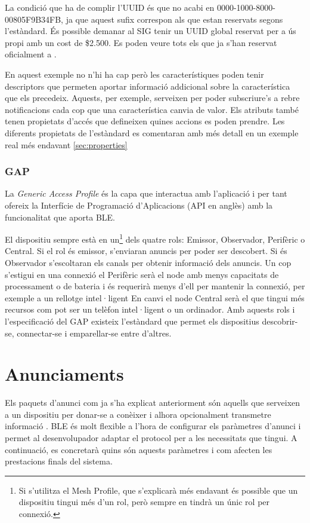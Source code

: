 La condició que ha de complir l'UUID és que no acabi en 0000-1000-8000-00805F9B34FB, ja que aquest sufix correspon als que estan reservats segons l'estàndard.
És possible demanar al SIG tenir un UUID global reservat per a ús propi amb un cost de \$2.500.
Es poden veure tots els que ja s'han reservat oficialment a \cite{reservedUUIDs}.

En aquest exemple no n'hi ha cap però les característiques poden tenir descriptors \cite{descriptors} que permeten aportar informació addicional sobre la característica que els precedeix.
Aquests, per exemple, serveixen per poder subscriure's a rebre notificacions cada cop que una característica canvia de valor.
Els atributs també tenen propietats d'accés que defineixen quines accions es poden prendre.
Les diferents propietats de l'estàndard es comentaran amb més detall en un exemple real més endavant \ref{sec:properties}

\subsubsection{GAP}
\label{GAP}
La \textit{Generic Access Profile} és la capa que interactua amb l'aplicació i per tant ofereix la Interfície de Programació d'Aplicacions (API en anglès) amb la funcionalitat que aporta BLE.

El dispositiu sempre està en un\footnote{Si s'utilitza el Mesh Profile, que s'explicarà més endavant és possible que un dispositiu tingui més d'un rol, però sempre en tindrà un únic rol per connexió.} dels quatre rols: Emissor, Observador, Perifèric o Central.
Si el rol és emissor, s'enviaran anuncis per poder ser descobert.
Si és Observador s'escoltaran els canals per obtenir informació dels anuncis.
Un cop s'estigui en una connexió el Perifèric serà el node amb menys capacitats de processament o de bateria i és requerirà menys d'ell per mantenir la connexió, per exemple a un rellotge intel·ligent
En canvi el node Central serà el que tingui més recursos com pot ser un telèfon intel·ligent o un ordinador.
Amb aquests rols i l'especificació del GAP existeix l'estàndard que permet els dispositius descobrir-se, connectar-se i emparellar-se entre d'altres.
\newpage


\section{Anunciaments}
Els paquets d'anunci com ja s'ha explicat anteriorment són aquells que serveixen a un dispositiu per donar-se a conèixer i alhora opcionalment transmetre informació \cite{Advertising}.
BLE és molt flexible a l'hora de configurar els paràmetres d'anunci i permet al desenvolupador adaptar el protocol per a les necessitats que tingui.
A continuació, es concretarà quins són aquests paràmetres i com afecten les prestacions finals del sistema.


